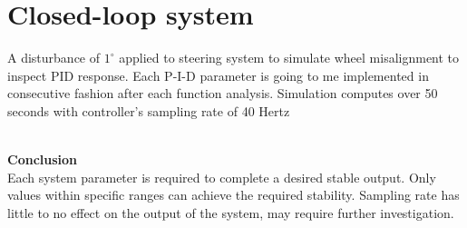 \section{Closed-loop system}%
\label{closedloop}
A disturbance of $1^{\circ}$ applied to steering system to simulate wheel misalignment to inspect PID response. 
Each P-I-D parameter is going to me implemented in consecutive fashion after each function analysis. Simulation computes over 50 seconds with controller's sampling rate of 40 Hertz

\\
\textbf{Conclusion}
\\
Each system parameter is required to complete a desired stable output. Only values within specific ranges can achieve the required stability. Sampling rate has little to no effect on the output of the system, may require further investigation.  